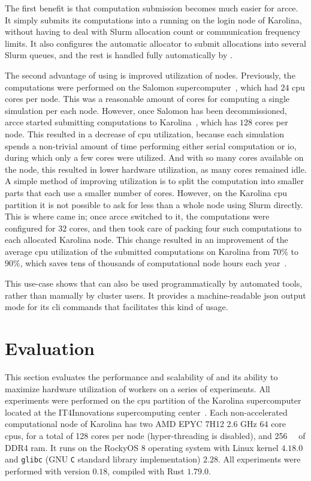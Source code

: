 The first benefit is that computation submission becomes much easier for \gls{arcce}.
It simply submits its computations into a \hyperqueue{} running on the login node of
Karolina, without having to deal with Slurm allocation count or communication frequency limits. It
also configures the automatic allocator to submit allocations into several Slurm queues, and the
rest is handled fully automatically by \hyperqueue{}.

The second advantage of using \hyperqueue{} is improved utilization of nodes. Previously,
the computations were performed on the Salomon supercomputer~\cite{salomon}, which had
$24$ \gls{cpu} cores per node. This was a reasonable amount of
cores for computing a single simulation per each node. However, once Salomon has been
decommissioned, \gls{arcce} started submitting computations to
Karolina~\cite{karolina}, which has $128$ cores per node. This resulted in
a decrease of \gls{cpu} utilization, because each simulation spends a non-trivial
amount of time performing either serial computation or \gls{io}, during which only a
few cores were utilized. And with so many cores available on the node, this resulted in lower
hardware utilization, as many cores remained idle. A simple method of improving utilization is to
split the computation into smaller parts that each use a smaller number of cores. However, on the
Karolina \gls{cpu} partition it is not possible to ask for less than a whole node
using Slurm directly. This is where \hyperqueue{} came in; once \gls{arcce}
switched to it, the computations were configured for $32$ cores, and
\hyperqueue{} then took care of packing four such computations to each allocated Karolina
node. This change resulted in an improvement of the average \gls{cpu} utilization of
the submitted computations on Karolina from $70\%$ to $90\%$, which
saves tens of thousands of computational node hours each year~\cite{cern-hq}.

This use-case shows that \hyperqueue{} can also be used programmatically by automated
tools, rather than manually by cluster users. It provides a machine-readable
\gls{json} output mode for its \gls{cli} commands that facilitates this
kind of usage.

\section{Evaluation}
\label{hq:evaluation}
This section evaluates the performance and scalability of \hyperqueue{} and its ability
to maximize hardware utilization of workers on a series of experiments. All experiments were
performed on the \gls{cpu} partition of the Karolina
supercomputer~\cite{karolina} located at the IT4Innovations supercomputing
center~\cite{it4i}. Each non-accelerated computational node of Karolina has two AMD
EPYC\texttrademark{} 7H12 2.6 GHz 64 core \glspl{cpu}, for a total of 128 cores
per node (hyper-threading is disabled), and \SI{256}{\gibi\byte} of DDR4
\gls{ram}. It runs on the RockyOS 8 operating system with Linux kernel
$4.18.0$ and \texttt{glibc} (GNU \texttt{C} standard library implementation) $2.28$. All experiments were
performed with \hyperqueue{} version $0.18$, compiled with Rust
$1.79.0$.

